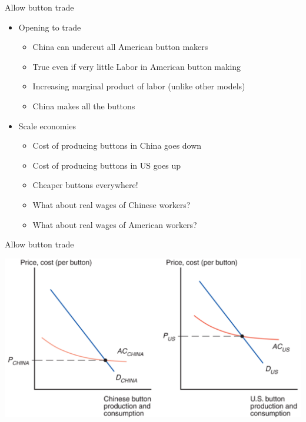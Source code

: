 \documentclass[ignorenonframetext,]{beamer}
\begin{document}
\begin{frame}{Allow button trade}

    \begin{itemize}
        \item Opening to trade
        \begin{itemize}
            \item China can undercut all American button makers 
            \item True even if very little Labor in American button making
            \item Increasing marginal product of labor (unlike other models)
            \item China makes all the buttons
        \end{itemize} 
        \item Scale economies
        \begin{itemize}
            \item Cost of producing buttons in China goes down
            \item Cost of producing buttons in US goes up 
            \item Cheaper buttons everywhere!
            \item What about real wages of Chinese workers?
            \item What about real wages of American workers?
        \end{itemize}
    \end{itemize}

\end{frame}

\begin{frame}{Allow button trade}

    \includegraphics[scale=0.20]{buttons_aut.png}

\end{frame}
\end{document}
